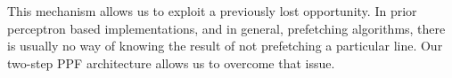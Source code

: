 This mechanism allows us to exploit a previously lost opportunity.  In prior
perceptron based implementations, and in general, prefetching algorithms,
there is usually no way of knowing the result of not prefetching a particular
line.  Our two-step PPF architecture allows us to overcome that issue.

%
%
%
%
%
%
%
